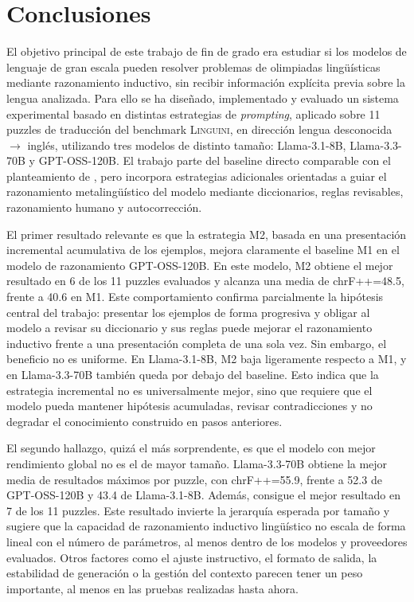 \chapter{Conclusiones}
\label{cap:conclusiones}

El objetivo principal de este trabajo de fin de grado era estudiar si los modelos de lenguaje de gran escala pueden resolver problemas de olimpiadas lingüísticas mediante razonamiento inductivo, sin recibir información explícita previa sobre la lengua analizada. Para ello se ha diseñado, implementado y evaluado un sistema experimental basado en distintas estrategias de \textit{prompting}, aplicado sobre 11 puzzles de traducción del benchmark \textsc{Linguini}, en dirección lengua desconocida $\rightarrow$ inglés, utilizando tres modelos de distinto tamaño: Llama-3.1-8B, Llama-3.3-70B y GPT-OSS-120B. El trabajo parte del baseline directo comparable con el planteamiento de \citet{sanchez2024linguini}, pero incorpora estrategias adicionales orientadas a guiar el razonamiento metalingüístico del modelo mediante diccionarios, reglas revisables, razonamiento humano y autocorrección.

El primer resultado relevante es que la estrategia M2, basada en una presentación incremental acumulativa de los ejemplos, mejora claramente el baseline M1 en el modelo de razonamiento GPT-OSS-120B. En este modelo, M2 obtiene el mejor resultado en 6 de los 11 puzzles evaluados y alcanza una media de chrF++=48.5, frente a 40.6 en M1. Este comportamiento confirma parcialmente la hipótesis central del trabajo: presentar los ejemplos de forma progresiva y obligar al modelo a revisar su diccionario y sus reglas puede mejorar el razonamiento inductivo frente a una presentación completa de una sola vez. Sin embargo, el beneficio no es uniforme. En Llama-3.1-8B, M2 baja ligeramente respecto a M1, y en Llama-3.3-70B también queda por debajo del baseline. Esto indica que la estrategia incremental no es universalmente mejor, sino que requiere que el modelo pueda mantener hipótesis acumuladas, revisar contradicciones y no degradar el conocimiento construido en pasos anteriores.

El segundo hallazgo, quizá el más sorprendente, es que el modelo con mejor rendimiento global no es el de mayor tamaño. Llama-3.3-70B obtiene la mejor media de resultados máximos por puzzle, con chrF++=55.9, frente a 52.3 de GPT-OSS-120B y 43.4 de Llama-3.1-8B. Además, consigue el mejor resultado en 7 de los 11 puzzles. Este resultado invierte la jerarquía esperada por tamaño y sugiere que la capacidad de razonamiento inductivo lingüístico no escala de forma lineal con el número de parámetros, al menos dentro de los modelos y proveedores evaluados. Otros factores como el ajuste instructivo, el formato de salida, la estabilidad de generación o la gestión del contexto parecen tener un peso importante, al menos en las pruebas realizadas hasta ahora.


